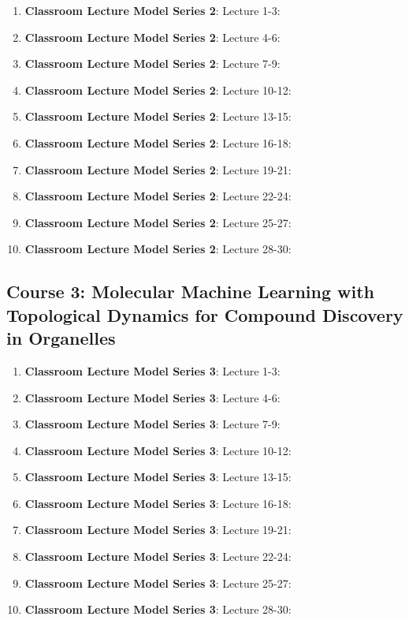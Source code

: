 \documentclass{ResumeDesignFormat1}
\begin{document}
\begin{enumerate}
\item \textbf{Classroom Lecture Model Series 2}: \textcolor{c1}{Lecture 1-3:}
\item \textbf{Classroom Lecture Model Series 2}: \textcolor{c1}{Lecture 4-6:}
\item \textbf{Classroom Lecture Model Series 2}: \textcolor{c1}{Lecture 7-9:}
\item \textbf{Classroom Lecture Model Series 2}: \textcolor{c1}{Lecture 10-12:}
\item \textbf{Classroom Lecture Model Series 2}: \textcolor{c1}{Lecture 13-15:}
\item \textbf{Classroom Lecture Model Series 2}: \textcolor{c1}{Lecture 16-18:}
\item \textbf{Classroom Lecture Model Series 2}: \textcolor{c1}{Lecture 19-21:}
\item \textbf{Classroom Lecture Model Series 2}: \textcolor{c1}{Lecture 22-24:}
\item \textbf{Classroom Lecture Model Series 2}: \textcolor{c1}{Lecture 25-27:}
\item \textbf{Classroom Lecture Model Series 2}: \textcolor{c1}{Lecture 28-30:}
\end{enumerate}

\subsection{Course 3: Molecular Machine Learning with Topological Dynamics for Compound Discovery in Organelles}

\begin{enumerate}
\item \textbf{Classroom Lecture Model Series 3}: \textcolor{c3}{Lecture 1-3:}
\item \textbf{Classroom Lecture Model Series 3}: \textcolor{c3}{Lecture 4-6:}
\item \textbf{Classroom Lecture Model Series 3}: \textcolor{c3}{Lecture 7-9:}
\item \textbf{Classroom Lecture Model Series 3}: \textcolor{c3}{Lecture 10-12:}
\item \textbf{Classroom Lecture Model Series 3}: \textcolor{c3}{Lecture 13-15:}
\item \textbf{Classroom Lecture Model Series 3}: \textcolor{c3}{Lecture 16-18:}
\item \textbf{Classroom Lecture Model Series 3}: \textcolor{c3}{Lecture 19-21:}
\item \textbf{Classroom Lecture Model Series 3}: \textcolor{c3}{Lecture 22-24:}
\item \textbf{Classroom Lecture Model Series 3}: \textcolor{c3}{Lecture 25-27:}
\item \textbf{Classroom Lecture Model Series 3}: \textcolor{c3}{Lecture 28-30:}
\end{enumerate}
\end{document}
